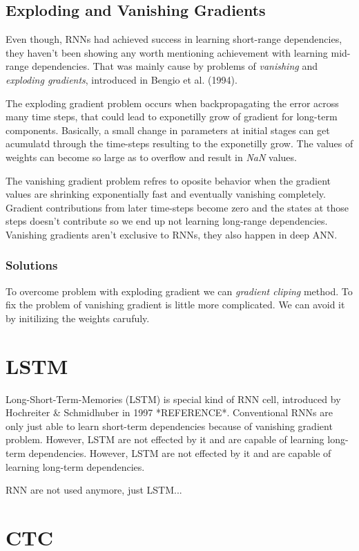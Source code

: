 \subsection{Exploding and Vanishing Gradients}

Even though, RNNs had achieved success in learning short-range dependencies, they haven’t been showing any worth mentioning achievement with learning mid-range dependencies.
That was mainly cause by problems of \textit{vanishing} and \textit{exploding gradients}, introduced in Bengio et al. (1994).

The exploding gradient problem occurs when backpropagating the error across many time steps, that could lead to exponetilly grow of gradient for long-term components.
Basically, a small change in parameters at initial stages can get acumulatd through the time-steps resulting to the exponetilly grow.
The values of weights can become so large as to overflow and result in \textit{NaN} values.

The vanishing gradient problem refres to oposite behavior when the gradient values are shrinking exponentially fast and eventually vanishing completely.
Gradient contributions from later time-steps become zero and the states at those steps doesn’t contribute so we end up not learning long-range dependencies.
Vanishing gradients aren’t exclusive to RNNs, they also happen in deep ANN.

\subsubsection{Solutions}

To overcome problem with exploding gradient we can \textit{gradient cliping} method.
To fix the problem of vanishing gradient is little more complicated.
We can avoid it by initilizing the weights carufuly.

\section{LSTM}

Long-Short-Term-Memories (LSTM) is special kind of RNN cell, introduced by Hochreiter & Schmidhuber in 1997 *REFERENCE*.
Conventional RNNs are only just able to learn short-term dependencies because of vanishing gradient problem.
However, LSTM are not effected by it and are capable of learning long-term dependencies.
However, LSTM are not effected by it and are capable of learning long-term dependencies.

RNN are not used anymore, just LSTM...



\section{CTC}
